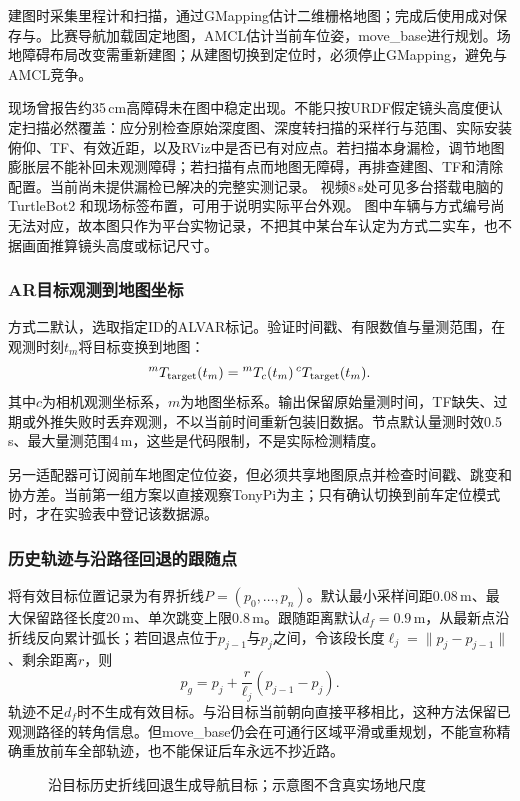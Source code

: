 建图时采集里程计和扫描，通过GMapping估计二维栅格地图；完成后使用成对保存与。比赛导航加载固定地图，AMCL估计当前车位姿，move\_base进行规划。场地障碍布局改变需重新建图；从建图切换到定位时，必须停止GMapping，避免与AMCL竞争。

现场曾报告约35\,cm高障碍未在图中稳定出现。不能只按URDF假定镜头高度便认定扫描必然覆盖：应分别检查原始深度图、深度转扫描的采样行与范围、实际安装俯仰、TF、有效近距，以及RViz中是否已有对应点。若扫描本身漏检，调节地图膨胀层不能补回未观测障碍；若扫描有点而地图无障碍，再排查建图、TF和清除配置。当前尚未提供漏检已解决的完整实测记录。
视频8\,s处可见多台搭载电脑的 TurtleBot2 和现场标签布置，可用于说明实际平台外观。
图中车辆与方式编号尚无法对应，故本图只作为平台实物记录，不把其中某台车认定为方式二实车，也不据画面推算镜头高度或标记尺寸。

\subsubsection{AR目标观测到地图坐标}
方式二默认，选取指定ID的ALVAR标记。验证时间戳、有限数值与量测范围，在观测时刻$t_m$将目标变换到地图：
\begin{equation}
{}^{m}T_{\rm target}(t_m)
={}^mT_c(t_m)\,{}^cT_{\rm target}(t_m).
\end{equation}
其中$c$为相机观测坐标系，$m$为地图坐标系。输出保留原始量测时间，TF缺失、过期或外推失败时丢弃观测，不以当前时间重新包装旧数据。节点默认量测时效0.5\,s、最大量测范围4\,m，这些是代码限制，不是实际检测精度。

另一适配器可订阅前车地图定位位姿，但必须共享地图原点并检查时间戳、跳变和协方差。当前第一组方案以直接观察TonyPi为主；只有确认切换到前车定位模式时，才在实验表中登记该数据源。

\subsubsection{历史轨迹与沿路径回退的跟随点}
将有效目标位置记录为有界折线$P=(p_0,\dots,p_n)$。默认最小采样间距0.08\,m、最大保留路径长度20\,m、单次跳变上限0.8\,m。跟随距离默认$d_f=0.9$\,m，从最新点沿折线反向累计弧长；若回退点位于$p_{j-1}$与$p_j$之间，令该段长度$\ell_j=\|p_j-p_{j-1}\|$、剩余距离$r$，则
\begin{equation}
p_g=p_j+\frac{r}{\ell_j}(p_{j-1}-p_j).
\end{equation}
轨迹不足$d_f$时不生成有效目标。与沿目标当前朝向直接平移相比，这种方法保留已观测路径的转角信息。但move\_base仍会在可通行区域平滑或重规划，不能宣称精确重放前车全部轨迹，也不能保证后车永远不抄近路。
\begin{figure}[H]\centering

\caption{沿目标历史折线回退生成导航目标；示意图不含真实场地尺度}
\end{figure}

